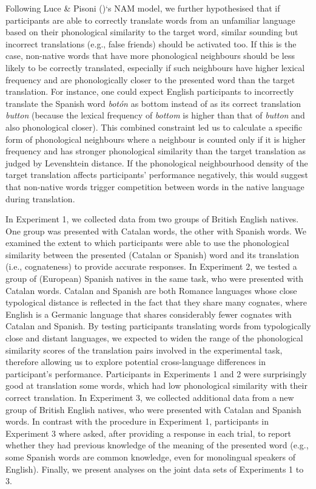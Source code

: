 \documentclass[
]{article}
\begin{document}
Following Luce \& Pisoni ()`s
NAM model, we further hypothesised that if participants are able to
correctly translate words from an unfamiliar language based on their
phonological similarity to the target word, similar sounding but
incorrect translations (e.g., false friends) should be activated too. If
this is the case, non-native words that have more phonological
neighbours should be less likely to be correctly translated, especially
if such neighbours have higher lexical frequency and are phonologically
closer to the presented word than the target translation. For instance,
one could expect English participants to incorrectly translate the
Spanish word \emph{botón} as bottom instead of as its correct
translation \emph{button} (because the lexical frequency of
\emph{bottom} is higher than that of \emph{button} and also phonological
closer). This combined constraint led us to calculate a specific form of
phonological neighbours where a neighbour is counted only if it is
higher frequency and has stronger phonological similarity than the
target translation as judged by Levenshtein distance. If the
phonological neighbourhood density of the target translation affects
participants' performance negatively, this would suggest that non-native
words trigger competition between words in the native language during
translation.

In Experiment 1, we collected data from two groups of British English
natives. One group was presented with Catalan words, the other with
Spanish words. We examined the extent to which participants were able to
use the phonological similarity between the presented (Catalan or
Spanish) word and its translation (i.e., cognateness) to provide
accurate responses. In Experiment 2, we tested a group of (European)
Spanish natives in the same task, who were presented with Catalan words.
Catalan and Spanish are both Romance languages whose close typological
distance is reflected in the fact that they share many cognates, where
English is a Germanic language that shares considerably fewer cognates
with Catalan and Spanish. By testing participants translating words from
typologically close and distant languages, we expected to widen the
range of the phonological similarity scores of the translation pairs
involved in the experimental task, therefore allowing us to explore
potential cross-language differences in participant's performance.
Participants in Experiments 1 and 2 were surprisingly good at
translation some words, which had low phonological similarity with their
correct translation. In Experiment 3, we collected additional data from
a new group of British English natives, who were presented with Catalan
and Spanish words. In contrast with the procedure in Experiment 1,
participants in Experiment 3 where asked, after providing a response in
each trial, to report whether they had previous knowledge of the meaning
of the presented word (e.g., some Spanish words are common knowledge,
even for monolingual speakers of English). Finally, we present analyses
on the joint data sets of Experiments 1 to 3.
\end{document}

